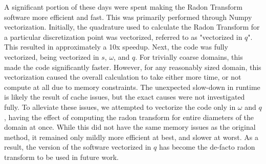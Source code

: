 
A significant portion of these days were spent making the Radon Transform software more efficient and fast.
This was primarily performed through Numpy vectorization.
Initially, the quadrature used to calculate the Radon Transform for a particular discretization point was vectorized, referred to as "vectorized in $q$".
This resulted in approximately a 10x speedup.
Next, the code was fully vectorized, being vectorized in $s$, $\omega$, and $q$.
For trivially coarse domains, this made the code significantly faster. 
However, for any reasonably sized domain, this vectorization caused the overall calculation to take either more time, or not compute at all due to memory constraints.
The unexpected slow-down in runtime is likely the result of cache issues, but the exact causes were not investigated fully.
To alleviate these issues, we attempted to vectorize the code only in $\omega$ and $q$, having the effect of computing the radon transform for entire diameters of the domain at once.
While this did not have the same memory issues as the original method, it remained only mildly more efficient at best, and slower at worst.
As a result, the version of the software vectorized in $q$ has become the de-facto radon transform to be used in future work.
